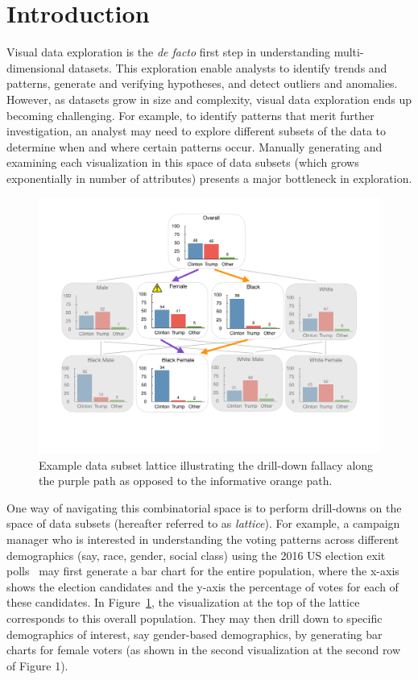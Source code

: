 \section{Introduction}
\par Visual data exploration is the \emph{de facto} first step in understanding multi-dimensional datasets. This exploration enable analysts to identify trends and patterns, generate and verifying hypotheses, and detect outliers and anomalies. However, as datasets grow in size and complexity, visual data exploration ends up becoming challenging. For example, to identify patterns that merit further investigation, an analyst may need to explore different subsets of the data to determine when and where certain patterns occur. Manually generating and examining each visualization in this space of data subsets (which grows exponentially in number of attributes) presents a major bottleneck in exploration.
\begin{figure}[ht!]
\includegraphics[width=\linewidth]{figures/elections_example_lattice_teaser.pdf}
\caption{Example data subset lattice illustrating the drill-down fallacy along the purple path as opposed to the informative orange path.}
\label{fig:elections_example}
\end{figure}
\par One way of navigating this combinatorial space is to perform drill-downs on the space of data subsets (hereafter referred to as \emph{lattice}). For example, a campaign manager who is interested in understanding the voting patterns across different demographics (say, race, gender, social class) using the 2016 US election exit polls~\cite{exitpolls} may first generate a bar chart for the entire population, where the x-axis shows the election candidates and the y-axis the percentage of votes for each of these candidates. In Figure~\ref{fig:elections_example}, the visualization at the top of the lattice corresponds to this overall population. They may then drill down to specific demographics of interest, say gender-based demographics, by generating bar charts for female voters (as shown in the second visualization at the second row of Figure 1).
